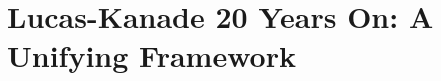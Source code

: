 \documentclass[letterpaper]{article}
\date{\today}
\begin{document}
\maketitle

\section{Lucas-Kanade 20 Years On: A Unifying Framework}




\end{document}
